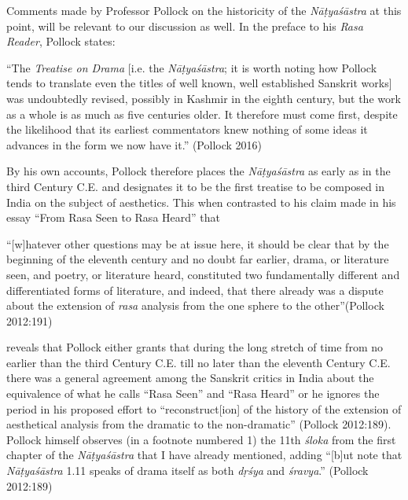 Comments made by Professor Pollock on the historicity of the \textsl{Nāṭyaśāstra} at this point, will be relevant to our discussion as well. In the preface to his \textsl{Rasa Reader}, Pollock states:

\begin{myquote}
“The \textsl{Treatise on Drama} [i.e. the \textsl{Nāṭyaśāstra}; it is worth noting how Pollock tends to translate even the titles of well known, well established Sanskrit works] was undoubtedly revised, possibly in Kashmir in the eighth century, but the work as a whole is as much as five centuries older. It therefore must come first, despite the likelihood that its earliest commentators knew nothing of some ideas it advances in the form we now have it.” 
\hfill (Pollock 2016) 
\end{myquote}

By his own accounts, Pollock therefore places the \textsl{Nāṭyaśāstra} as early as in the third Century C.E. and designates it to be the first treatise to be composed in India on the subject of aesthetics. This when contrasted to his claim made in his essay ``From Rasa Seen to Rasa Heard'' that 

\begin{myquote}
“[w]hatever other questions may be at issue here, it should be clear that by the beginning of the eleventh century and no doubt far earlier, drama, or literature seen, and poetry, or literature heard, constituted two fundamentally different and differentiated forms of literature, and indeed, that there already was a dispute about the extension of \textsl{rasa} analysis from the one sphere to the other”\hfill (Pollock 2012:191) 
\end{myquote}

reveals that Pollock either grants that during the long stretch of time from no earlier than the third Century C.E. till no later than the eleventh Century C.E. there was a general agreement among the Sanskrit critics in India about the equivalence of what he calls “Rasa Seen” and “Rasa Heard” or he ignores the period in his proposed effort to “reconstruct[ion] of the history of the extension of aesthetical analysis from the dramatic to the non-dramatic” (Pollock 2012:189). Pollock himself observes (in a footnote numbered 1) the 11th \textsl{śloka} from the first chapter of the \textsl{Nāṭyaśāstra} that I have already mentioned, adding “[b]ut note that \textsl{Nāṭyaśāstra} 1.11 speaks of drama itself as both \textsl{dṛśya} and \textsl{śravya}.” (Pollock 2012:189) 

